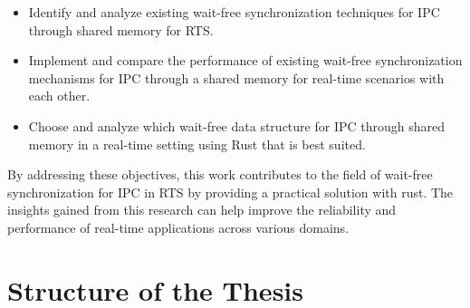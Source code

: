 \begin{itemize}
\item Identify and analyze existing wait-free synchronization techniques for \ac{IPC} through shared memory for \ac{RTS}.
\item Implement and compare the performance of existing wait-free synchronization mechanisms for \ac{IPC} through a shared memory for real-time scenarios with each other.
\item Choose and analyze which wait-free data structure for \ac{IPC} through shared memory in a real-time setting using Rust that is best suited.
\end{itemize}

By addressing these objectives, this work contributes to the field of wait-free synchronization for \ac{IPC} in \ac{RTS} by providing a practical solution with rust. The insights gained from this research can help improve the reliability and performance of real-time applications across various domains.

\section{Structure of the Thesis}\label{sec:structure-of-the-thesis}


